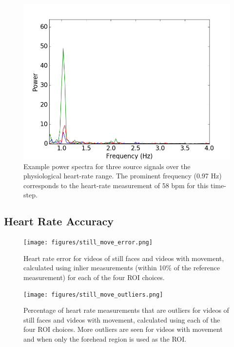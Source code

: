 \documentclass[10pt,twocolumn,letterpaper]{article}
\begin{document}
\begin{figure}
\begin{center}
	\includegraphics[scale=0.48]{figures/spectrum_10sec.png}
\end{center}
\caption{Example power spectra for three source signals over the physiological heart-rate range. The prominent frequency (0.97 Hz) corresponds to the heart-rate measurement of 58 bpm for this time-step.}
\label{freq_plot}
\end{figure}

\subsection{Heart Rate Accuracy} \label{hr_acc}

\begin{figure}
\begin{center}
	\texttt{[image: figures/still\_move\_error.png]}
\end{center}
\caption{Heart rate error for videos of still faces and videos with movement, calculated using inlier measurements (within 10\% of the reference measurement) for each of the four ROI choices.}
\label{still_move_error}
\end{figure}

\begin{figure}
\begin{center}
	\texttt{[image: figures/still\_move\_outliers.png]}
\end{center}
\caption{Percentage of heart rate measurements that are outliers for videos of still faces and videos with movement, calculated using each of the four ROI choices. More outliers are seen for videos with movement and when only the forehead region is used as the ROI.}
\label{still_move_outliers}
\end{figure}
\end{document}
